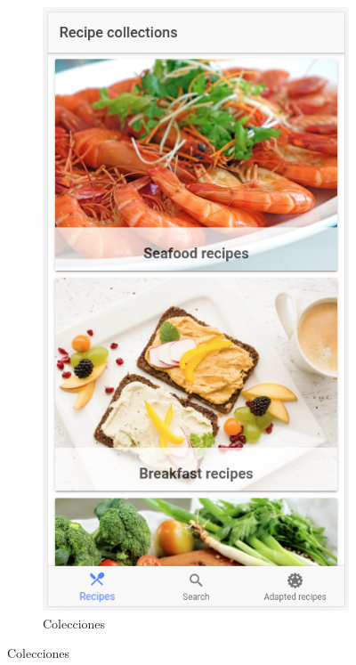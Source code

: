 \begin{figure}[H]
    \centering
    
    \begin{subfigure}[b]{0.322\linewidth}
        \includegraphics[width=\linewidth]{imagenes/app/pantallas/app_1.png}
        \caption{Colecciones}

\end{subfigure}
\end{figure}
